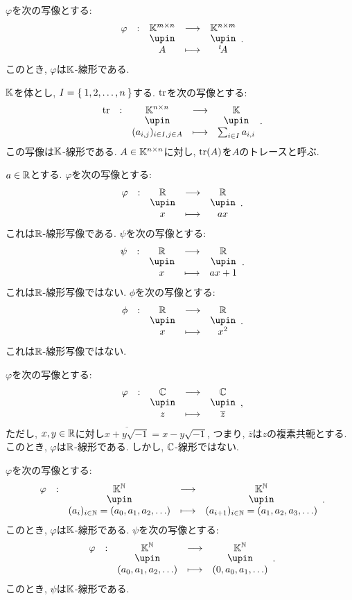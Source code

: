 \begin{example}
  $\varphi$を次の写像とする:
  \begin{align*}
    \shazo{\varphi}{\KK^{m\times n}}{\KK^{n\times m}}{A}{\transposed{A}}.
  \end{align*}
  このとき, $\varphi$は$\mathbb{K}$-線形である.
\end{example}

\begin{example}
  $\mathbb{K}$を体とし,
  $I=\Set{1,2,\ldots, n}$する.
  $\operatorname{tr}$を次の写像とする:
  \begin{align*}
    \shazo{\tr}{\KK^{n\times n}}{\KK}{(a_{i,j})_{i\in I, j\in A}}{\sum_{i\in I}a_{i,i}}.
  \end{align*}
  この写像は$\mathbb{K}$-線形である.
  $A\in \mathbb{K}^{n\times n}$に対し,
  $\operatorname{tr}(A)$を$A$のトレースと呼ぶ.
\end{example}

\begin{example}
  $a\in\mathbb{R}$とする.
  $\varphi$を次の写像とする:
  \begin{align*}
    \shazo{\varphi}{\RR}{\RR}{x}{ax}.
  \end{align*}
  これは$\mathbb{R}$-線形写像である.
  $\psi$を次の写像とする:
  \begin{align*}
    \shazo{\psi}{\RR}{\RR}{x}{ax+1}.
  \end{align*}
  これは$\mathbb{R}$-線形写像ではない.
  $\phi$を次の写像とする:
  \begin{align*}
    \shazo{\phi}{\RR}{\RR}{x}{x^2}.
  \end{align*}
  これは$\mathbb{R}$-線形写像ではない.
\end{example}


\begin{example}
  $\varphi$を次の写像とする:
  \begin{align*}
    \shazo{\varphi}{\CC}{\CC}{z}{\overline{z}},
  \end{align*}
  ただし, 
  $x,y\in\mathbb{R}$に対し$\overline{x+y\sqrt{-1}}=x-y\sqrt{-1}$, つまり,
  $\overline{z}$は$z$の複素共軛とする.
  このとき, $\varphi$は$\mathbb{R}$-線形である.
  しかし, $\mathbb{C}$-線形ではない.
\end{example}


\begin{example}
  $\varphi$を次の写像とする:
  \begin{align*}
    \shazo{\varphi}{\KK^\NN}{\KK^\NN}
    {(a_i)_{i\in \NN}=(a_0,a_1,a_2,\ldots)}{(a_{i+1})_{i\in \NN}=(a_1,a_2,a_3,\ldots)}.
  \end{align*}
  このとき, $\varphi$は$\mathbb{K}$-線形である.
  $\psi$を次の写像とする:
  \begin{align*}
    \shazo{\varphi}{\KK^\NN}{\KK^\NN}
    {(a_0,a_1,a_2,\ldots)}{(0,a_0,a_1,\ldots)}.
  \end{align*}
  このとき, $\psi$は$\mathbb{K}$-線形である.
\end{example}

